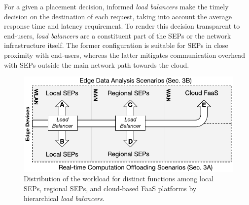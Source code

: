 For a given a placement decision, informed \textit{load balancers} make the timely decision on the destination of each request, taking into account the average response time and latency requirement. 
To render this decision transparent to end-users, 
\textit{load balancers} are a constituent part of the SEPs or the network infrastructure itself. The former configuration is suitable for SEPs in close proximity with end-users, whereas the latter mitigates communication overhead with SEPs outside the main network path towards the cloud.



\begin{figure}[b]
	\centering
	\includegraphics[width=1\linewidth]{Figs/Edge_Load_Placement}
	\caption{Distribution of the workload for distinct functions among local SEPs, regional SEPs, and cloud-based FaaS platforms by hierarchical \textit{load balancers}.}
	\label{fig:Edge_Load_Placement}
\end{figure}

 








